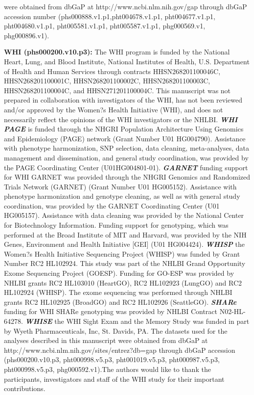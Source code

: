 \documentclass[12pt]{article}
\begin{document}
were obtained from dbGaP at http://www.ncbi.nlm.nih.gov/gap through dbGaP accession number (phs000888.v1.p1,pht004678.v1.p1, pht004677.v1.p1, pht004680.v1.p1, pht005581.v1.p1, pht005587.v1.p1, phg000569.v1, phg000896.v1).

\textbf{WHI (phs000200.v10.p3):} The WHI program is funded by the National Heart, Lung, and Blood Institute, National Institutes of Health, U.S. Department of Health and Human Services through contracts HHSN268201100046C, HHSN268201100001C, HHSN268201100002C, HHSN268201100003C, HHSN268201100004C, and HHSN271201100004C. This manuscript was not prepared in collaboration with investigators of the WHI, has not been reviewed and/or approved by the Women?s Health Initiative (WHI), and does not necessarily reflect the opinions of the WHI investigators or the NHLBI. \textbf{\textit{WHI PAGE}} is funded through the NHGRI Population Architecture Using Genomics and Epidemiology (PAGE) network (Grant Number U01 HG004790). Assistance with phenotype harmonization, SNP selection, data cleaning, meta-analyses, data management and dissemination, and general study coordination, was provided by the PAGE Coordinating Center (U01HG004801-01). \textbf{\textit{GARNET}} funding support for WHI GARNET was provided through the NHGRI Genomics and Randomized Trials Network (GARNET) (Grant Number U01 HG005152). Assistance with phenotype harmonization and genotype cleaning, as well as with general study coordination, was provided by the GARNET Coordinating Center (U01 HG005157). Assistance with data cleaning was provided by the National Center for Biotechnology Information. Funding support for genotyping, which was performed at the Broad Institute of MIT and Harvard, was provided by the NIH Genes, Environment and Health Initiative [GEI] (U01 HG004424). \textbf{\textit{WHISP}} the Women?s Health Initiative Sequencing Project (WHISP) was funded by Grant Number RC2 HL102924. This study was part of the NHLBI Grand Opportunity Exome Sequencing Project (GOESP). Funding for GO-ESP was provided by NHLBI grants RC2 HL103010 (HeartGO), RC2 HL102923 (LungGO) and RC2 HL102924 (WHISP). The exome sequencing was performed through NHLBI grants RC2 HL102925 (BroadGO) and RC2 HL102926 (SeattleGO). \textbf{\textit{SHARe}} funding for WHI SHARe genotyping was provided by NHLBI Contract N02-HL-64278. \textbf{\textit{WHISE}} the WHI Sight Exam and the Memory Study was funded in part by Wyeth Pharmaceuticals, Inc, St. Davids, PA. The datasets used for the analyses described in this manuscript were obtained from dbGaP at http://www.ncbi.nlm.nih.gov/sites/entrez?db=gap through dbGaP accession (phs000200.v10.p3, pht000998.v5.p3, pht001019.v5.p3, pht000987.v5.p3, pht000998.v5.p3, phg000592.v1).The authors would like to thank the participants, investigators and staff of the WHI study for their important contributions.

\newpage
{}
 
 
\end{document}
